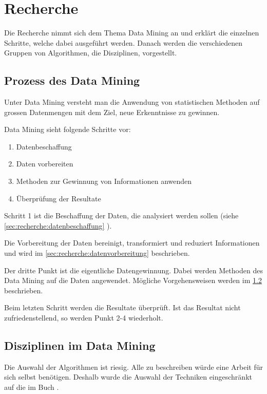 \chapter{Recherche}
\label{sec:recherche}
Die Recherche nimmt sich dem Thema Data Mining an und erklärt die einzelnen Schritte, welche dabei ausgeführt werden. Danach werden die verschiedenen Gruppen von Algorithmen, die Disziplinen, vorgestellt. 

\section{Prozess des Data Mining}
\label{sec:recherche:dataminingtechniken}
Unter Data Mining versteht man die Anwendung von statistischen Methoden auf grossen Datenmengen mit dem Ziel, neue Erkenntnisse zu gewinnen.

Data Mining sieht folgende Schritte vor:
\begin{enumerate}
	\item Datenbeschaffung
	\item Daten vorbereiten
	\item Methoden zur Gewinnung von Informationen anwenden
	\item Überprüfung der Resultate
\end{enumerate}

Schritt 1 ist die Beschaffung der Daten, die analysiert werden sollen (siehe \cref{sec:recherche:datenbeschaffung} ). 

Die Vorbereitung der Daten bereinigt, transformiert und reduziert Informationen und wird im \cref{sec:recherche:datenvorbereitung}  beschrieben.

Der dritte Punkt ist die eigentliche Datengewinnung. Dabei werden Methoden des Data Mining auf die Daten angewendet. Mögliche Vorgehensweisen werden im \cref{sec:recherche:dataminingtechniken:disziplinen}  beschrieben.

Beim letzten Schritt werden die Resultate überprüft. Ist das Resultat nicht zufriedenstellend, so werden Punkt 2-4 wiederholt.

\section{Disziplinen im Data Mining}
\label{sec:recherche:dataminingtechniken:disziplinen}
Die Auswahl der Algorithmen ist riesig. Alle zu beschreiben würde eine Arbeit für sich selbst benötigen. Deshalb wurde die Auswahl der Techniken eingeschränkt auf die im Buch \cite{data_mining_concepts_and_techniques}. 
 
